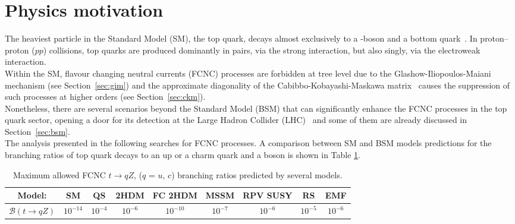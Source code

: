 \section{Physics motivation}
The heaviest particle in the Standard Model (SM), the top quark, decays almost exclusively to a \PW-boson and a bottom quark~\cite{pdg2}. In proton--proton ($pp$) collisions, top quarks are produced dominantly in pairs, via the strong interaction, but also singly, via the electroweak interaction. \\%
Within the SM, flavour changing neutral currents (FCNC) processes are forbidden at tree level due to the Glashow-Iliopoulos-Maiani mechanism \cite{gim} (see Section~\ref{sec:gim}) and the approximate diagonality of the Cabibbo-Kobayashi-Maskawa matrix~\cite{pdg2} causes the suppression of such processes at higher orders (see Section~\ref{sec:ckm}).\\
Nonetheless, there are several scenarios beyond the Standard Model (BSM) that can significantly enhance the FCNC processes in the top quark sector, opening a door for its detection at the Large Hadron Collider (LHC)~\cite{aguilar,barger,h2dm_limit,mssm_limit,RPV_limit, extra_limit} and some of them are already discussed in Section~\ref{sec:bsm}. \\
The analysis presented in the following searches for FCNC \tZc processes. A comparison between SM and BSM models predictions for the branching ratios of top quark decays to an up or a charm quark and a \PZ boson is shown in Table \ref{tab:intro-fcnc-br-th}.\\

\begin{table}[h]
	\begin{adjustbox}{max width=1.\textwidth,center}
		\begin{tabular}{ccccccccc}
			\hline 
			Model:&  			                         SM&  				   QS&  			   2HDM&  				FC 2HDM				& MSSM 			&  RPV SUSY			&  			RS				& EMF \\ 
			\hline 
			$\mathcal{B}(t\rightarrow qZ)$ & $10^{-14}$     & $10^{-4}$ &  $10^{-6}$          & $10^{-10}$  & $10^{-7}$      &$10^{-6}$            & $10^{-5}$           & $10^{-6}$  \\ 
			\hline 
		\end{tabular} 
	\end{adjustbox}
	\caption{Maximum allowed FCNC $t\rightarrow qZ$, ($q$ = $u$, $c$) branching ratios predicted by several models\cite{tcZ_sm,qs_limit,h2dm_limit,mssm_limit,RPV_limit,extra_limit,rs_limit,report_limit}.}
	\label{tab:intro-fcnc-br-th}
\end{table} 

